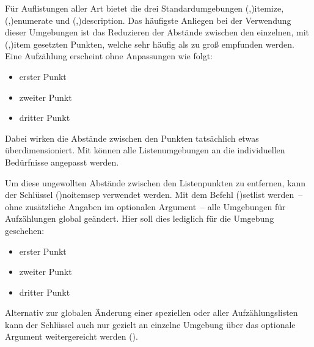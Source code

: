 \documentclass[%
  english,ngerman,%
  cdgeometry=no,DIV=12,%
  cd=false,cdfont=false,cdtitle=true,%
  headings=normal,%
  automark,%
  listof=toc,%
]{tudscrartcl}
\begin{document}
Für Auflistungen aller Art bietet  die drei Standardumgebungen 
\Environment(,){itemize},
\Environment(,){enumerate} und
\Environment(,){description}. Das 
häufigste Anliegen bei der Verwendung dieser Umgebungen ist das Reduzieren 
der Abstände zwischen den einzelnen, mit 
\Macro(,){item} gesetzten Punkten, 
welche sehr häufig als zu groß empfunden werden. Eine Aufzählung erscheint ohne 
Anpassungen wie folgt:
%
\begin{Hint*}
\begin{itemize}
\item erster Punkt
\item zweiter Punkt
\item dritter Punkt
\end{itemize}
\end{Hint*}
%
Dabei wirken die Abstände zwischen den Punkten tatsächlich etwas 
überdimensioniert. Mit  können alle Listenumgebungen an die 
individuellen Bedürfnisse angepasst werden. 
%
\begin{Preamble}
\usepackage{enumitem}
\end{Preamble}
%
Um diese ungewollten Abstände zwischen den Listenpunkten zu entfernen, kann der 
Schlüssel \Option(){noitemsep} verwendet werden. Mit dem 
Befehl \Macro(){setlist} werden~-- ohne zusätzliche Angaben 
im optionalen Argument~-- alle Umgebungen für Aufzählungen global geändert. 
Hier soll dies lediglich für die Umgebung  geschehen:
\begin{Preamble*}

\end{Preamble*}
\begin{Hint*}
\begin{itemize}
\item erster Punkt
\item zweiter Punkt
\item dritter Punkt
\end{itemize}

\end{Hint*}
%
Alternativ zur globalen Änderung einer speziellen oder aller Aufzählungslisten 
kann der Schlüssel  auch nur gezielt an einzelne Umgebung 
über das optionale Argument weitergereicht werden 
().
\end{document}
